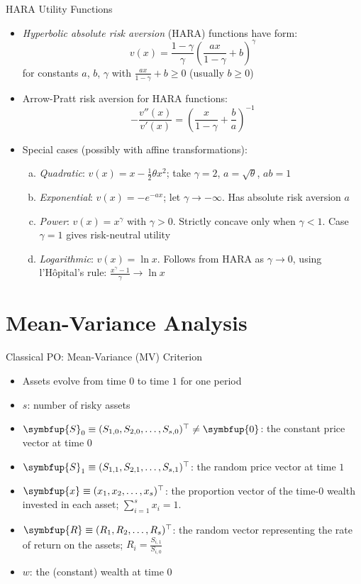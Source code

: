\documentclass[10pt,handout]{beamer}
\newcommand{\ds}{\displaystyle}
\newcommand{\vx}{\symbfup{x}}
\newcommand{\vS}{\symbfup{S}}
\newcommand{\vR}{\symbfup{R}}
\newcommand{\vZero}{\symbfup{0}}
\theoremstyle{definition}
\begin{document}
\begin{frame}{HARA Utility Functions}
  \begin{itemize}[<+->]
    \item \emph{Hyperbolic absolute risk aversion} (HARA) functions have form:
      \[v(x) = \frac{1-\gamma}{\gamma}\left(\frac{ax}{1-\gamma} + b\right)^\gamma\]
      for constants $a$, $b$, $\gamma$ with $\ds\frac{ax}{1-\gamma} + b \geqslant 0$ (usually $b \geqslant 0$)
    \item Arrow-Pratt risk aversion for HARA functions:
      \[-\frac{v''(x)}{v'(x)} = \left(\frac{x}{1-\gamma} + \frac{b}{a}\right)^{-1}\]
    \item Special cases (possibly with affine transformations):
      \begin{enumerate}[(a)]
        \item \emph{Quadratic}: $v(x) = x - \frac{1}{2}\theta x^2$; take $\gamma = 2$, $a = \sqrt{\theta}$, $ab = 1$
        \item \emph{Exponential}: $v(x) = -e^{-ax}$; let $\gamma \to -\infty$. Has absolute risk aversion $a$
        \item \emph{Power}: $v(x) = x^\gamma$ with $\gamma > 0$. Strictly concave only when $\gamma < 1$. Case $\gamma = 1$ gives risk-neutral utility
        \item \emph{Logarithmic}: $v(x) = \ln x$. Follows from HARA as $\gamma \to 0$, using l'Hôpital's rule: $\ds\frac{x^\gamma - 1}{\gamma} \to \ln x$
      \end{enumerate}
  \end{itemize}
\end{frame}

\section{Mean-Variance Analysis}

\begin{frame}{Classical PO: Mean-Variance (MV) Criterion}
  \begin{itemize}[<+->]
    \item Assets evolve from time $0$ to time $1$ for one period
    \item $s$: number of risky assets 
    \item $\vS_0\equiv(S_{1, 0}, S_{2, 0}, \ldots, S_{s, 0})^\top\not=\vZero$: the constant price vector at time $0$
    \item $\vS_1\equiv(S_{1, 1}, S_{2, 1}, \ldots, S_{s, 1})^\top$: the random price vector at time $1$
    \item $\vx\equiv(x_1, x_2, \ldots, x_s)^\top$: the proportion vector of the time-$0$ wealth invested in each asset; $\ds\sum_{i=1}^s x_i = 1$.
    \item $\vR\equiv(R_1, R_2, \ldots, R_s)^\top$: the random vector representing the rate of return on the assets; $\ds R_i = \frac{S_{i, 1}}{S_{i, 0}}$
    \item $w$: the (constant) wealth at time $0$
  \end{itemize}
\end{frame}
\end{document}
